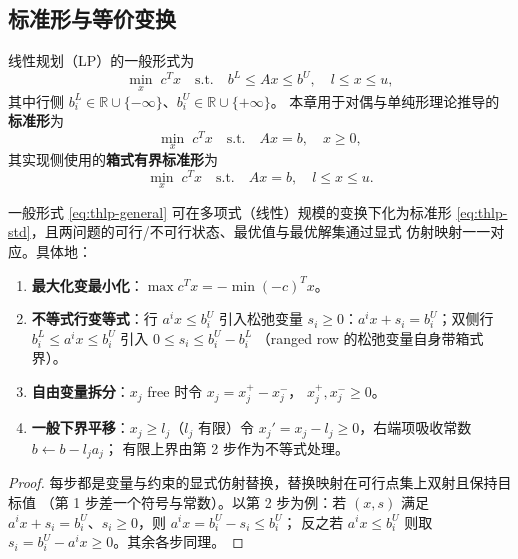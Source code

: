 \subsection{标准形与等价变换}\label{subsec:thlp-standard}

\begin{definition}[一般形式与标准形]\label{def:thlp-std}
线性规划（LP）的一般形式为
\begin{equation}\label{eq:thlp-general}
  \min_{x}\; c^{T}x
  \quad\text{s.t.}\quad
  b^{L}\le Ax\le b^{U},\quad l\le x\le u,
\end{equation}
其中行侧 $b^{L}_i\in\mathbb{R}\cup\{-\infty\}$、$b^{U}_i\in\mathbb{R}\cup\{+\infty\}$。
本章用于对偶与单纯形理论推导的\textbf{标准形}为
\begin{equation}\label{eq:thlp-std}
  \min_{x}\; c^{T}x \quad\text{s.t.}\quad Ax=b,\quad x\ge 0,
\end{equation}
其实现侧使用的\textbf{箱式有界标准形}为
\begin{equation}\label{eq:thlp-boxed}
  \min_{x}\; c^{T}x \quad\text{s.t.}\quad Ax=b,\quad l\le x\le u .
\end{equation}
\end{definition}

\begin{proposition}[等价变换]\label{prop:thlp-transform}
一般形式 \eqref{eq:thlp-general} 可在多项式（线性）规模的变换下化为标准形
\eqref{eq:thlp-std}，且两问题的可行/不可行状态、最优值与最优解集通过显式
仿射映射一一对应。具体地：
\begin{enumerate}
  \item \textbf{最大化变最小化}：$\max c^{T}x=-\min(-c)^{T}x$。
  \item \textbf{不等式行变等式}：行 $a^{i}x\le b^{U}_i$ 引入松弛变量
        $s_i\ge0$：$a^{i}x+s_i=b^{U}_i$；双侧行
        $b^{L}_i\le a^{i}x\le b^{U}_i$ 引入 $0\le s_i\le b^{U}_i-b^{L}_i$
        （ranged row 的松弛变量自身带箱式界）。
  \item \textbf{自由变量拆分}：$x_j$ free 时令 $x_j=x_j^{+}-x_j^{-}$，
        $x_j^{+},x_j^{-}\ge0$。
  \item \textbf{一般下界平移}：$x_j\ge l_j$（$l_j$ 有限）令
        $x_j'=x_j-l_j\ge0$，右端项吸收常数 $b\leftarrow b-l_j a_j$；
        有限上界由第 2 步作为不等式处理。
\end{enumerate}
\end{proposition}

\begin{proof}
每步都是变量与约束的显式仿射替换，替换映射在可行点集上双射且保持目标值
（第 1 步差一个符号与常数）。以第 2 步为例：若 $(x,s)$ 满足
$a^{i}x+s_i=b^{U}_i$、$s_i\ge0$，则 $a^{i}x=b^{U}_i-s_i\le b^{U}_i$；
反之若 $a^{i}x\le b^{U}_i$ 则取 $s_i=b^{U}_i-a^{i}x\ge0$。其余各步同理。
\end{proof}

